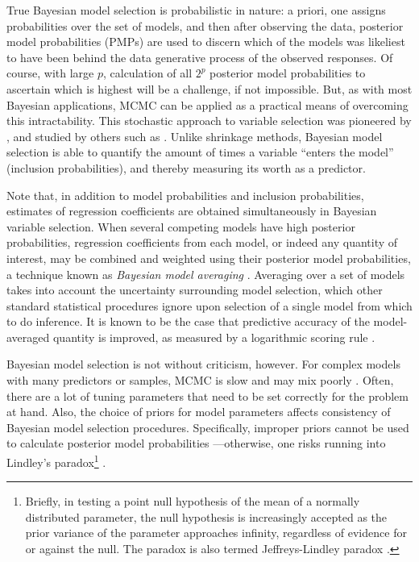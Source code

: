 \documentclass[11pt,twoside,openright]{report}
\begin{document}
True Bayesian model selection is probabilistic in nature: a priori, one assigns probabilities over the set of models, and then after observing the data, posterior model probabilities (PMPs) are used to discern which of the models was likeliest to have been behind the data generative process of the observed responses.
Of course, with large  $p$, calculation of all $2^p$ posterior model probabilities to ascertain which is highest will be a challenge, if not impossible.
But, as with most Bayesian applications, MCMC can be applied as a practical means of overcoming this intractability.
This stochastic approach to variable selection was pioneered by \citet{George1993}, and studied by others such as \citet{Kuo1998,dellaportas2002bayesian,Ntzoufras2008}.
Unlike shrinkage methods, Bayesian model selection is able to quantify the amount of times a variable ``enters the model'' (inclusion probabilities), and thereby measuring its worth as a  predictor.

\thispagestyle{chaptersix}
Note that, in addition to model probabilities and inclusion probabilities, estimates of regression coefficients are obtained simultaneously in Bayesian variable selection.
When several competing models have high posterior probabilities, regression coefficients from each model, or indeed any quantity of interest, may be combined and weighted using their posterior model probabilities, a technique known as \emph{Bayesian model averaging} \citep{madigan1994model,hoeting1999bayesian}.
Averaging over a set of models takes into account the uncertainty surrounding model selection, which other standard statistical procedures ignore upon selection of a single model from which to do inference.
It is known to be the case that predictive accuracy of the model-averaged quantity is improved, as measured by a logarithmic scoring rule \citep{raftery1997bayesian}.

\label{errata18}
Bayesian model selection is not without criticism, however.
For complex models with many predictors or samples, MCMC is slow and may mix poorly \citep{OHara2009}.
Often, there are a lot of tuning parameters that need to be set correctly for the problem at hand.
Also, the choice of priors for model parameters affects consistency of Bayesian model selection procedures. 
Specifically, improper priors cannot be used to calculate posterior model probabilities \citep{casella2009consistency}---otherwise, one risks running into Lindley's paradox\footnote{Briefly, in testing a point null hypothesis of the mean of a normally distributed parameter, the null hypothesis is increasingly accepted as the prior variance of the parameter approaches infinity, regardless of evidence for or against the null.
The paradox is also termed Jeffreys-Lindley paradox \citep{robert2014jeffreys}.} \citep{lindley1957statistical}.
\end{document}
